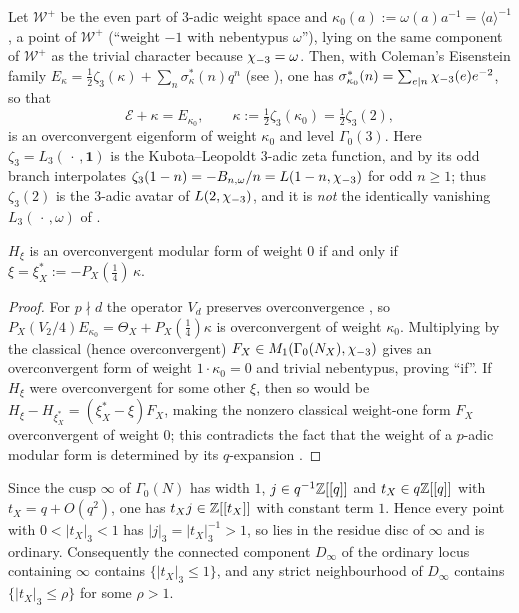 \begin{lemma}\label{lem:avatar}
\Lit{} Let $\mathcal W^+$ be the even part of $3$-adic weight space and
$\kappa_0(a):=\omega(a)a^{-1}=\langle a\rangle^{-1}$, a point of $\mathcal W^+$
(``weight $-1$ with nebentypus $\omega$''), lying on the same component of
$\mathcal W^+$ as the trivial character because $\chi_{-3}=\omega$.  Then, with
Coleman's Eisenstein family $E_\kappa=\tfrac12\zeta_3(\kappa)+\sum_n\sigma^*_\kappa(n)q^n$
\textup{\cite{Coleman1997,ColemanMazur1998}} (see \textup{\cite[Thm.~2.3]{Cal05}}),
one has $\sigma^*_{\kappa_0}(n)=\sum_{e\mid n}\chi_{-3}(e)e^{-2}$, so that
\[
\mathcal E+\kappa=E_{\kappa_0},\qquad \kappa:=\tfrac12\zeta_3(\kappa_0)=\tfrac12\zeta_3(2),
\]
is an overconvergent eigenform of weight $\kappa_0$ and level $\Gamma_0(3)$.
Here $\zeta_3=L_3(\,\cdot\,,\mathbf 1)$ is the Kubota--Leopoldt $3$-adic zeta
function, and by \textup{\cite[Thm.~5.11]{Washington1997}} its odd branch
interpolates $\zeta_3(1-n)=-B_{n,\omega}/n=L(1-n,\chi_{-3})$ for odd $n\ge1$; thus
$\zeta_3(2)$ is the $3$-adic avatar of $L(2,\chi_{-3})$, and it is \emph{not} the
identically vanishing $L_3(\,\cdot\,,\omega)$ of \textup{\cite[\S4]{Cal05}}.
\end{lemma}

\begin{lemma}[characterisation]\label{lem:charoc}
\Proved{} $H_\xi$ is an overconvergent modular form of weight $0$ if and only if
$\xi=\xi^*_X:=-P_X(\tfrac14)\,\kappa$.
\end{lemma}
\begin{proof}
For $p\nmid d$ the operator $V_d$ preserves overconvergence
\cite[\S B]{Coleman1997}, so $P_X(V_2/4)E_{\kappa_0}=\Theta_X+P_X(\tfrac14)\kappa$
is overconvergent of weight $\kappa_0$.  Multiplying by the classical (hence
overconvergent) $F_X\in M_1(\Gamma_0(N_X),\chi_{-3})$ gives an overconvergent form
of weight $1\cdot\kappa_0=0$ and trivial nebentypus, proving ``if''.  If $H_\xi$
were overconvergent for some other $\xi$, then so would be
$H_\xi-H_{\xi^*_X}=(\xi^*_X-\xi)F_X$, making the nonzero classical weight-one
form $F_X$ overconvergent of weight $0$; this contradicts the fact that the
weight of a $p$-adic modular form is determined by its $q$-expansion
\cite[4.4]{Katz1973}.
\end{proof}

\begin{lemma}\label{lem:orddisc}
\Proved{} Since the cusp $\infty$ of $\Gamma_0(N)$ has width $1$, $j\in q^{-1}\mathbb{Z}[[q]]$
and $t_X\in q\mathbb{Z}[[q]]$ with $t_X=q+O(q^2)$, one has $t_Xj\in\mathbb{Z}[[t_X]]$ with constant
term $1$.  Hence every point with $0<|t_X|_3<1$ has $|j|_3=|t_X|_3^{-1}>1$, so lies
in the residue disc of $\infty$ and is ordinary.  Consequently the connected
component $D_\infty$ of the ordinary locus containing $\infty$ contains
$\{|t_X|_3\le1\}$, and any strict neighbourhood of $D_\infty$ contains
$\{|t_X|_3\le\rho\}$ for some $\rho>1$.
\end{lemma}

